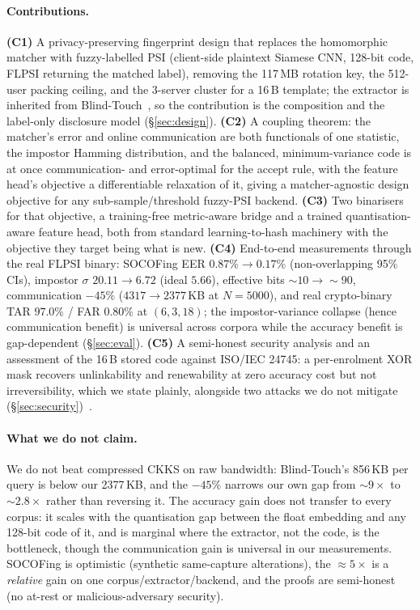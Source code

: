 \paragraph{Contributions.} \textbf{(C1)} A privacy-preserving fingerprint design that replaces the
homomorphic matcher with fuzzy-labelled PSI (client-side plaintext Siamese CNN, 128-bit code, FLPSI
returning the matched label), removing the 117\,MB rotation key, the 512-user packing ceiling, and the
3-server cluster for a 16\,B template; the extractor is inherited from Blind-Touch~\cite{ChoiWooKim24},
so the contribution is the composition and the label-only disclosure model (\S\ref{sec:design}).
\textbf{(C2)} A coupling theorem: the matcher's error and online communication are both functionals of
one statistic, the impostor Hamming distribution, and the balanced, minimum-variance code is at once
communication- and error-optimal for the accept rule, with the feature head's objective a
differentiable relaxation of it, giving a matcher-agnostic design objective for any
sub-sample/threshold fuzzy-PSI backend. \textbf{(C3)} Two binarisers for that objective, a training-free
metric-aware bridge and a trained quantisation-aware feature head, both from standard
learning-to-hash machinery with the objective they target being what is new. \textbf{(C4)} End-to-end
measurements through the real FLPSI binary: SOCOFing EER $0.87\% \to 0.17\%$ (non-overlapping 95\% CIs),
impostor $\sigma$ $20.11 \to 6.72$ (ideal $5.66$), effective bits $\sim\!10 \to \sim\!90$, communication
$-45\%$ ($4317 \to 2377$\,KB at $N{=}5000$), and real crypto-binary TAR $97.0\%$ / FAR $0.80\%$ at
$(6,3,18)$; the impostor-variance collapse (hence communication benefit) is universal across corpora
while the accuracy benefit is gap-dependent (\S\ref{sec:eval}). \textbf{(C5)} A semi-honest security
analysis and an assessment of the 16\,B stored code against ISO/IEC 24745: a per-enrolment XOR mask
recovers unlinkability and renewability at zero accuracy cost but not irreversibility, which we state
plainly, alongside two attacks we do not mitigate
(\S\ref{sec:security})~\cite{ISO24745,GomezBarreroGalbally20}.

\paragraph{What we do not claim.} We do not beat compressed CKKS on raw bandwidth: Blind-Touch's
856\,KB per query is below our 2377\,KB, and the $-45\%$ narrows our own gap from $\sim9\times$ to
$\sim2.8\times$ rather than reversing it. The accuracy gain does not transfer to every corpus: it scales
with the quantisation gap between the float embedding and any 128-bit code of it, and is marginal where
the extractor, not the code, is the bottleneck, though the communication gain is universal in our
measurements. SOCOFing is optimistic (synthetic same-capture alterations), the $\approx 5\times$ is a
\emph{relative} gain on one corpus/extractor/backend, and the proofs are semi-honest (no at-rest or
malicious-adversary security).

